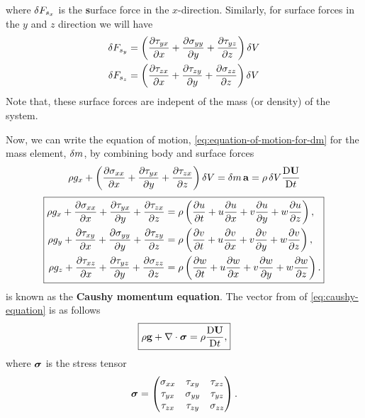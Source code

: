 %
where \(\mathop{}\!\delta F_{s_x}\) is the \textbf{s}urface force in the \(x\)-direction.
Similarly, for surface forces in the $y$ and \(z\) direction we will have
%
\begin{equation}
	\begin{aligned}
		\mathop{}\!\delta F_{s_y} & = \left(\frac{\partial \tau_{yx}}{\partial x} + \frac{\partial \sigma_{yy}}{\partial y} + \frac{\partial \tau_{yz}}{\partial z}\right) \mathop{}\!\delta V \\
		\mathop{}\!\delta F_{s_z} & = \left(\frac{\partial \tau_{zx}}{\partial x} + \frac{\partial \tau_{zy}}{\partial y} + \frac{\partial \sigma_{zz}}{\partial z}\right) \mathop{}\!\delta V
	\end{aligned}
	\label{eq:sum-of-surface-forces-y-and-z-dir}
\end{equation}
%
Note that, these surface forces are indepent of the mass (or density) of the system.

Now, we can write the equation of motion, \cref{eq:equation-of-motion-for-dm} for the mass element, \(\mathop{}\!\delta m\), by combining body and surface forces
%
\begin{equation*}
  \rho g_x + \left(\frac{\partial\sigma_{xx}}{\partial x} + \frac{\partial\tau_{yx}}{\partial y} + \frac{\partial\tau_{zx}}{\partial z}\right) \mathop{}\!\delta V
  = \mathop{}\!\delta m\, \mathbf{a} = \rho \mathop{}\!\delta V \frac{\mathop{}\!\mathrm{D} \mathbf{U}}{\mathop{}\!\mathrm{D} t}
\end{equation*}
\begin{equation}
  \boxed{
  \begin{aligned}
  \rho g_x + \frac{\partial\sigma_{xx}}{\partial x} + \frac{\partial\tau_{yx}}{\partial y} + \frac{\partial\tau_{zx}}{\partial z}
  &= \rho \left(\frac{\partial u}{\partial t} + u\frac{\partial u}{\partial x} + v\frac{\partial u}{\partial y} + w\frac{\partial u}{\partial z}\right),\\
    \rho g_y + \frac{\partial\tau_{xy}}{\partial x} + \frac{\partial\sigma_{yy}}{\partial y} + \frac{\partial\tau_{zy}}{\partial z}
  &= \rho \left(\frac{\partial v}{\partial t} + u\frac{\partial v}{\partial x} + v\frac{\partial v}{\partial y} + w\frac{\partial v}{\partial z}\right),\\
    \rho g_z + \frac{\partial\tau_{xz}}{\partial x} + \frac{\partial\tau_{yz}}{\partial y} + \frac{\partial\sigma_{zz}}{\partial z}
  &= \rho \left(\frac{\partial w}{\partial t} + u\frac{\partial w}{\partial x} + v\frac{\partial w}{\partial y} + w\frac{\partial w}{\partial z}\right).
  \end{aligned}
  }
  \label{eq:caushy-equation}
\end{equation}
%
 is known as the \textbf{Caushy momentum equation}.
The vector from of \cref{eq:caushy-equation} is as follows
%
\begin{equation}
  \boxed{
    \rho \mathbf{g} + \mathop{}\!\nabla \cdot \boldsymbol{\mathbf{\sigma}} = \rho \frac{\mathop{}\!\mathrm{D} \mathbf{U}}{\mathop{}\!\mathrm{D} t},
  }
  \label{eq:caushy-equation-vector-notation}
\end{equation}
%
where \(\boldsymbol{\mathbf{\sigma}}\) is the stress tensor
%
\begin{equation}
  \boldsymbol{\mathbf{\sigma}} = \begin{pmatrix}
    \sigma_{xx} & \tau_{xy}   & \tau_{xz} \\
    \tau_{yx}   & \sigma_{yy} & \tau_{yz} \\
    \tau_{zx}   & \tau_{zy}   & \sigma_{zz}
  \end{pmatrix}.
  \label{eq:stress-tensor}
\end{equation}

